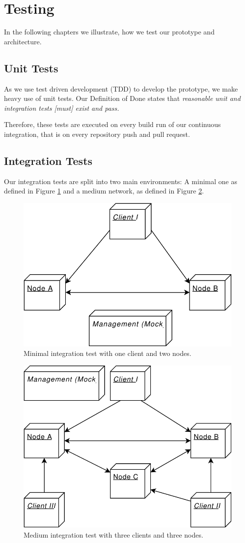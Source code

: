 
\section{Testing}
\label{testing}

In the following chapters we illustrate, how we test our prototype and architecture.

\subsection{Unit Tests}\label{unit-tests}
As we use test driven development (TDD) to develop the prototype, we make heavy use of unit tests. Our Definition of Done\cite{project-plan} states that \emph{reasonable unit and integration tests [must] exist and pass.}

Therefore, these tests are executed on every build run of our continuous integration, that is on every repository push and pull request.


\subsection{Integration Tests}\label{integration-tests}
Our integration tests are split into two main environments: A minimal one as defined in Figure \ref{fig:integrationtestsmall} and a medium network, as defined in Figure \ref{fig:integrationtestmedium}.

\begin{figure}
	\centering
	\includegraphics[width=0.5\linewidth]{resources/integration_test_small}
	\caption[Minimal integration test]{Minimal integration test with one client and two nodes.}
	\label{fig:integrationtestsmall}
\end{figure}

\begin{figure}
	\centering
	\includegraphics[width=0.5\linewidth]{resources/integration_test_medium}
	\caption[Medium integration test]{Medium integration test with three clients and three nodes.}
	\label{fig:integrationtestmedium}
\end{figure}

